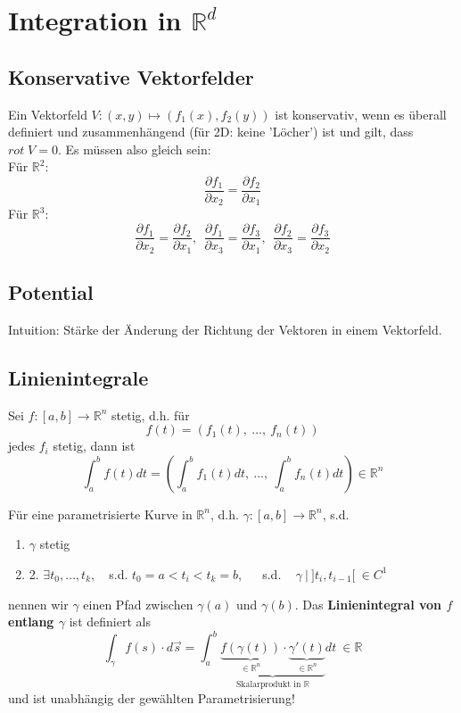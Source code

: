 \section{Integration in $\mathbb{R}^d$}

\subsection{Konservative Vektorfelder}
Ein Vektorfeld $V: (x, y) \mapsto (f_1(x), f_2(y))$ ist konservativ, wenn es überall definiert
und zusammenhängend (für 2D: keine 'Löcher') ist und gilt, dass $rot \;V = 0$. Es müssen also gleich sein:\\
Für $\mathbb{R}^2$:
\[ \frac{\partial f_1}{\partial x_2} = \frac{\partial f_2}{\partial x_1} \]
Für $\mathbb{R}^3$:
\[ \frac{\partial f_1}{\partial x_2} =  \frac{\partial f_2}{\partial x_1}, 
~~  \frac{\partial f_1}{\partial x_3} = \frac{\partial f_3}{\partial x_1},
~~ \frac{\partial f_2}{\partial x_3} =  \frac{\partial f_3}{\partial x_2}
\]


\subsection{Potential}

Intuition: Stärke der Änderung der Richtung der Vektoren in einem Vektorfeld.



\subsection{Linienintegrale}

Sei $f: [a, b] \rightarrow \mathbb{R}^{n}$ stetig, d.h. für
\[ f(t) = (f_1(t), ~ \ldots, ~ f_n(t)) \]
jedes $f_i$ stetig, dann ist
\[ \int_a^b f(t) dt = \left( \int_a^b f_1(t) dt, ~ \ldots , ~ \int_a^b f_n(t) dt\right) \in \mathbb{R}^n \]

Für eine parametrisierte Kurve in $\mathbb{R}^n$, d.h.
$\gamma : [a, b] \rightarrow \mathbb{R}^n$, s.d.
\begin{enumerate}
\item{ $\gamma$ stetig}
\item{2. $\exists t_0, \ldots, t_k$, ~ s.d. $t_0 = a < t_i < t_k = b$, ~~ s.d. ~
$\gamma ~ | ~ ]t_i, t_{i-1}[ ~ \in C^1$}
\end{enumerate}
nennen wir $\gamma$ einen Pfad zwischen
$\gamma(a)$ und $\gamma(b)$. 
Das \textbf{Linienintegral von $f$ entlang $\gamma$} ist definiert als
\[ \int_{\gamma} f(s)\cdot d\vec{s} = 
	\int_a^b \underbrace{\underbrace{f(\gamma(t))}_{\in\mathbb{R}^n}  \cdot 
	\underbrace{\gamma'(t)}_{\in\mathbb{R}^n}}_{\text{Skalarprodukt in } \mathbb{R}} dt  ~
	\in \mathbb{R} \]
und ist unabhängig der gewählten Parametrisierung!


